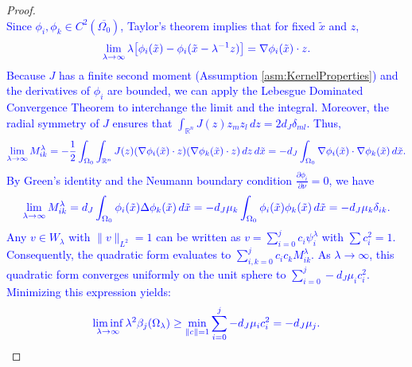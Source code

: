 \documentclass[12pt, a4paper]{article}
\newcommand{\revision}[1]{\textcolor{blue}{#1}}
\theoremstyle{break}
\theoremstyle{break}
\theoremstyle{break}
\theoremstyle{break}
\theoremstyle{break}
\theoremstyle{break}
\theoremstyle{break}
\theoremstyle{break}
\theoremstyle{break}
\begin{document}
\begin{proof}
\begin{equation}
    \end{equation}
    \revision{Since $\phi_i, \phi_k \in C^2(\overline{\Omega_0})$, Taylor's theorem implies that for fixed $\tilde{x}$ and $z$,}
    \begin{equation}
        \revision{\lim_{\lambda \to \infty} \lambda \big[ \phi_i(\tilde{x}) - \phi_i(\tilde{x} - \lambda^{-1} z) \big] = \nabla \phi_i(\tilde{x}) \cdot z.}
    \end{equation}
    \revision{Because $J$ has a finite second moment (Assumption \ref{asm:KernelProperties}) and the derivatives of $\phi_i$ are bounded, we can apply the Lebesgue Dominated Convergence Theorem to interchange the limit and the integral. Moreover, the radial symmetry of $J$ ensures that $\int_{\mathbb{R}^n} J(z) z_m z_l \, dz = 2 d_J \delta_{ml}$. Thus,}
    \begin{equation}
        \revision{\lim_{\lambda \to \infty} M_{ik}^\lambda = -\frac{1}{2} \int_{\Omega_0} \int_{\mathbb{R}^n} J(z) (\nabla \phi_i(\tilde{x}) \cdot z) (\nabla \phi_k(\tilde{x}) \cdot z) \, dz \, d\tilde{x} = -d_J \int_{\Omega_0} \nabla \phi_i(\tilde{x}) \cdot \nabla \phi_k(\tilde{x}) \, d\tilde{x}.}
    \end{equation}
    \revision{By Green's identity and the Neumann boundary condition $\frac{\partial \phi_i}{\partial \nu} = 0$, we have}
    \begin{equation}
        \revision{\lim_{\lambda \to \infty} M_{ik}^\lambda = d_J \int_{\Omega_0} \phi_i(\tilde{x}) \Delta \phi_k(\tilde{x}) \, d\tilde{x} = -d_J \mu_k \int_{\Omega_0} \phi_i(\tilde{x}) \phi_k(\tilde{x}) \, d\tilde{x} = -d_J \mu_k \delta_{ik}.}
    \end{equation}
    \revision{Any $v \in W_\lambda$ with $\|v\|_{L^2} = 1$ can be written as $v = \sum_{i=0}^j c_i \psi_i^\lambda$ with $\sum c_i^2 = 1$. Consequently, the quadratic form evaluates to $\sum_{i,k=0}^j c_i c_k M_{ik}^\lambda$. As $\lambda \to \infty$, this quadratic form converges uniformly on the unit sphere to $\sum_{i=0}^j -d_J \mu_i c_i^2$. Minimizing this expression yields:}
    \begin{equation}
        \revision{\liminf_{\lambda \to \infty} \lambda^2 \beta_j(\Omega_\lambda) \geq \min_{\|c\|=1} \sum_{i=0}^j -d_J \mu_i c_i^2 = -d_J \mu_j.}
    \end{equation}


\end{proof}
\end{document}
